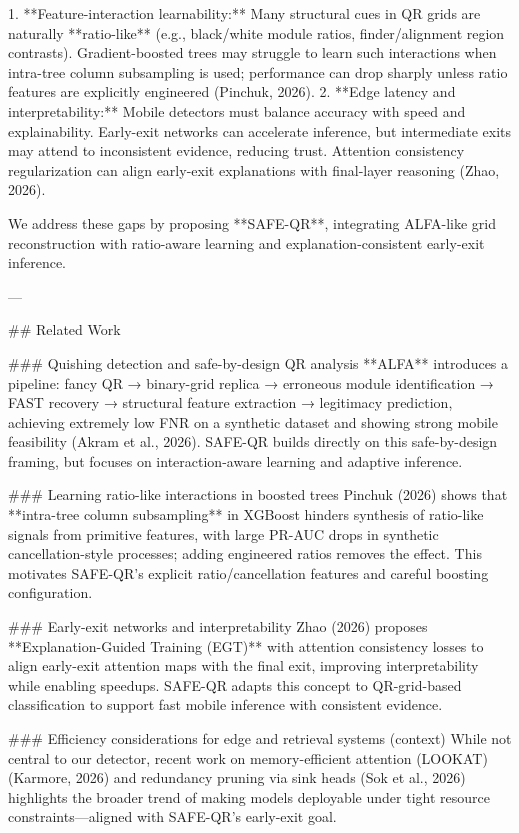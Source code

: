 1. **Feature-interaction learnability:** Many structural cues in QR grids are naturally **ratio-like** (e.g., black/white module ratios, finder/alignment region contrasts). Gradient-boosted trees may struggle to learn such interactions when intra-tree column subsampling is used; performance can drop sharply unless ratio features are explicitly engineered (Pinchuk, 2026).  
2. **Edge latency and interpretability:** Mobile detectors must balance accuracy with speed and explainability. Early-exit networks can accelerate inference, but intermediate exits may attend to inconsistent evidence, reducing trust. Attention consistency regularization can align early-exit explanations with final-layer reasoning (Zhao, 2026).

We address these gaps by proposing **SAFE-QR**, integrating ALFA-like grid reconstruction with ratio-aware learning and explanation-consistent early-exit inference.

---

## Related Work  

### Quishing detection and safe-by-design QR analysis  
**ALFA** introduces a pipeline: fancy QR → binary-grid replica → erroneous module identification → FAST recovery → structural feature extraction → legitimacy prediction, achieving extremely low FNR on a synthetic dataset and showing strong mobile feasibility (Akram et al., 2026). SAFE-QR builds directly on this safe-by-design framing, but focuses on interaction-aware learning and adaptive inference.

### Learning ratio-like interactions in boosted trees  
Pinchuk (2026) shows that **intra-tree column subsampling** in XGBoost hinders synthesis of ratio-like signals from primitive features, with large PR-AUC drops in synthetic cancellation-style processes; adding engineered ratios removes the effect. This motivates SAFE-QR’s explicit ratio/cancellation features and careful boosting configuration.

### Early-exit networks and interpretability  
Zhao (2026) proposes **Explanation-Guided Training (EGT)** with attention consistency losses to align early-exit attention maps with the final exit, improving interpretability while enabling speedups. SAFE-QR adapts this concept to QR-grid-based classification to support fast mobile inference with consistent evidence.

### Efficiency considerations for edge and retrieval systems (context)  
While not central to our detector, recent work on memory-efficient attention (LOOKAT) (Karmore, 2026) and redundancy pruning via sink heads (Sok et al., 2026) highlights the broader trend of making models deployable under tight resource constraints—aligned with SAFE-QR’s early-exit goal.

